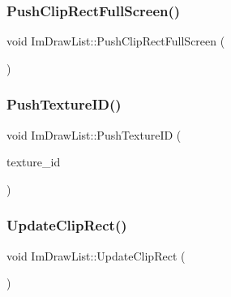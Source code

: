 \hypertarget{struct_im_draw_list_a0ab1ab409f0e269755e50a77901bae39}{}\label{struct_im_draw_list_a0ab1ab409f0e269755e50a77901bae39} 
\subsubsection{\texorpdfstring{Push\+Clip\+Rect\+Full\+Screen()}{PushClipRectFullScreen()}}
{\footnotesize\ttfamily void Im\+Draw\+List\+::\+Push\+Clip\+Rect\+Full\+Screen (\begin{DoxyParamCaption}{ }\end{DoxyParamCaption})}

\hypertarget{struct_im_draw_list_ac0dc0ecf692ab4c6ce58dd5381efb20d}{}\label{struct_im_draw_list_ac0dc0ecf692ab4c6ce58dd5381efb20d} 
\subsubsection{\texorpdfstring{Push\+Texture\+I\+D()}{PushTextureID()}}
{\footnotesize\ttfamily void Im\+Draw\+List\+::\+Push\+Texture\+ID (\begin{DoxyParamCaption}\item[{const Im\+Texture\+ID \&}]{texture\+\_\+id }\end{DoxyParamCaption})}

\hypertarget{struct_im_draw_list_a5978db1fc49be781978699e85c6a3251}{}\label{struct_im_draw_list_a5978db1fc49be781978699e85c6a3251} 
\subsubsection{\texorpdfstring{Update\+Clip\+Rect()}{UpdateClipRect()}}
{\footnotesize\ttfamily void Im\+Draw\+List\+::\+Update\+Clip\+Rect (\begin{DoxyParamCaption}{ }\end{DoxyParamCaption})}

\hypertarget{struct_im_draw_list_a58998853ed37538ae5a638da032b0005}{}\label{struct_im_draw_list_a58998853ed37538ae5a638da032b0005} 
